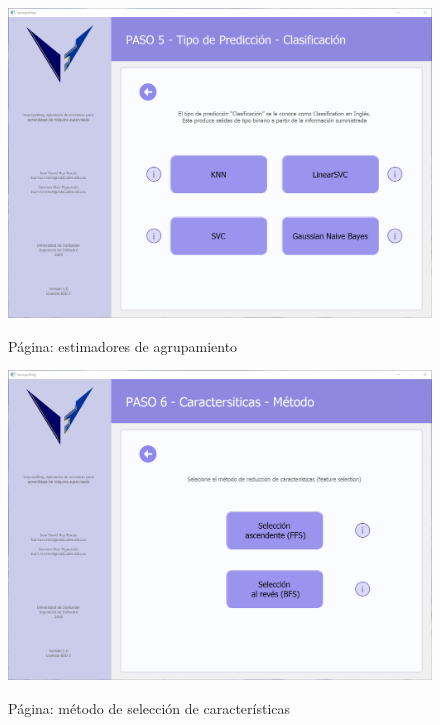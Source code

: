 \begin{figure}[H]
    \centering
    \caption{Página: estimadores de agrupamiento}
    \includegraphics[width=\textwidth]{images/classificationestimator.png}
    \label{fig:clusterestimators}
\end{figure}

\begin{figure}[H]
    \centering
    \caption{Página: método de selección de características}
    \includegraphics[width=\textwidth]{images/featureselectionmethod.png}
    \label{fig:featureselectionmethod}
\end{figure}

